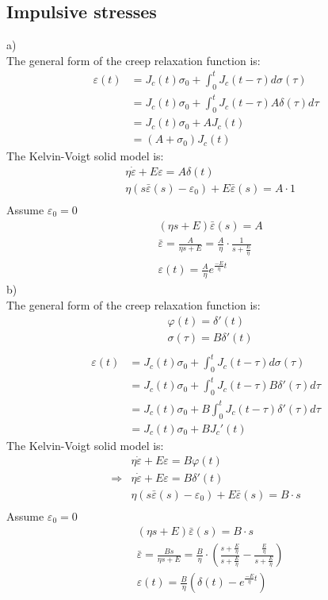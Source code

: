 \documentclass{elsarticle}
\begin{document}
\subsection{Impulsive stresses}
a)\\
The general form of the creep relaxation function is:
\begin{align*}
    \varepsilon(t)&=J_c(t)\sigma_0+\int^t_0J_c(t-\tau)d\sigma(\tau)\\
    &=J_c(t)\sigma_0+\int^t_0J_c(t-\tau)A\delta(\tau)d\tau\\
    &=J_c(t)\sigma_0+A J_c(t)\\
    &=(A+\sigma_0)J_c(t)
\end{align*}
The Kelvin-Voigt solid model is:
\begin{align*}
    &\eta\dot{\varepsilon}+E\varepsilon=A\delta(t)\\
    &\eta(s\bar{\varepsilon}(s)-\varepsilon_0)+E\bar{\varepsilon}(s)=A\cdot 1\\
\end{align*}
Assume $\varepsilon_0 =0$
\begin{align*}
    &(\eta s+E)\bar{\varepsilon}(s)=A\\
    &\bar{\varepsilon}=\frac{A}{\eta s +E}=\frac{A}{\eta}\cdot\frac{1}{s+\frac{E}{\eta}}\\
    &\varepsilon(t)=\frac{A}{\eta}e^{\frac{-E}{\eta}t}
\end{align*}
b)\\
The general form of the creep relaxation function is:
\begin{align*}
    &\varphi(t)=\delta'(t)\\
    &\sigma(\tau)=B\delta'(t)\\
\end{align*}
\begin{align*}
    \varepsilon(t)&=J_c(t)\sigma_0+\int^t_0J_c(t-\tau)d\sigma(\tau)\\
    &=J_c(t)\sigma_0+\int^t_0J_c(t-\tau)B\delta'(\tau)d\tau\\
    &=J_c(t)\sigma_0+B\int^t_0J_c(t-\tau)\delta'(\tau)d\tau\\
    &=J_c(t)\sigma_0+BJ_c'(t)
\end{align*}
The Kelvin-Voigt solid model is:
\begin{align*}
    &\eta\dot{\varepsilon}+E\varepsilon=B\varphi(t)\\
    \Rightarrow&\eta\dot{\varepsilon}+E\varepsilon=B\delta'(t)\\
    &\eta(s\bar{\varepsilon}(s)-\varepsilon_0)+E\bar{\varepsilon}(s)=B\cdot s\\
\end{align*}
Assume $\varepsilon_0 =0$
\begin{align*}
    &(\eta s+E)\bar{\varepsilon}(s)=B\cdot s\\
    &\bar{\varepsilon}=\frac{Bs}{\eta s +E}=\frac{B}{\eta}\cdot(\frac{s+\frac{E}{\eta}}{s+\frac{E}{\eta}}-\frac{\frac{E}{\eta}}{s+\frac{E}{\eta}})\\
    &\varepsilon(t)=\frac{B}{\eta}(\delta (t)-e^{\frac{-E}{\eta}t})
\end{align*}
\end{document}

